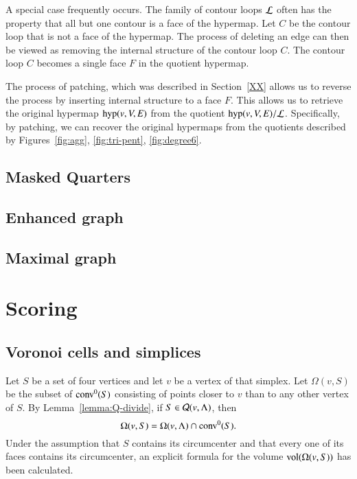 A special case frequently occurs.  The family of contour loops
$\cal L$ often has the property that all but one contour is
a face of the hypermap.  Let $C$ be the contour loop that
is not a face of the hypermap.  The process of deleting an
edge can then be viewed as removing the internal structure
of the contour loop $C$.  The contour loop $C$ becomes a single
face $F$ in the quotient hypermap.

The process of patching, which was described in Section~\ref{XX} allows
us to reverse the process by inserting internal structure to
a face $F$.  This allows us to retrieve the original hypermap
${\operatorname{hyp}}(v,V,E)$
from the quotient
${\operatorname{hyp}}(v,V,E)/{\cal L}$.  Specifically, by patching, we can recover
the original hypermaps from the quotients described by
Figures~\ref{fig:agg}, \ref{fig:tri-pent}, \ref{fig:degree6}.

\subsection{Masked Quarters}



\subsection{Enhanced graph}
\subsection{Maximal graph}

\section{Scoring}





\subsection{Voronoi cells and simplices}


Let $S$ be a set of four vertices and let $v$ be a vertex of that simplex. Let
$\Omega(v,S)$ be the subset of ${\operatorname{conv}}^0(S)$ consisting of points closer
to $v$ than to any other vertex of $S$. By
Lemma~\ref{lemma:Q-divide}, if $S\in{\mathcal Q}(v,\Lambda)$, then
$$\Omega(v,S) = \Omega(v,\Lambda)\cap{\operatorname{conv}}^0(S).$$
Under the assumption that $S$ contains its circumcenter and that
every one of its faces contains its circumcenter, an explicit
formula for the volume ${\operatorname{vol}}(\Omega(v,S))$ has been
calculated.  %

